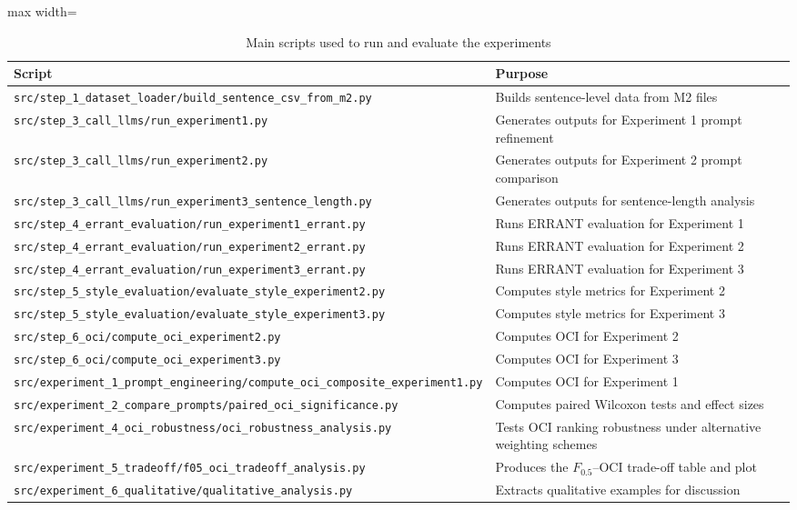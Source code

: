 \begin{table}[htbp]
    \centering
    \caption{Main scripts used to run and evaluate the experiments}
    \label{tab:appendix_scripts}
    \renewcommand{\arraystretch}{1.15}
    \begin{adjustbox}{max width=\textwidth}
    \begin{tabular}{p{6cm}p{7cm}}
        \toprule
        \textbf{Script} & \textbf{Purpose} \\
        \midrule
        \texttt{src/step\_1\_dataset\_loader/build\_sentence\_csv\_from\_m2.py} & Builds sentence-level data from M2 files \\
        \texttt{src/step\_3\_call\_llms/run\_experiment1.py} & Generates outputs for Experiment 1 prompt refinement \\
        \texttt{src/step\_3\_call\_llms/run\_experiment2.py} & Generates outputs for Experiment 2 prompt comparison \\
        \texttt{src/step\_3\_call\_llms/run\_experiment3\_sentence\_length.py} & Generates outputs for sentence-length analysis \\
        \texttt{src/step\_4\_errant\_evaluation/run\_experiment1\_errant.py} & Runs ERRANT evaluation for Experiment 1 \\
        \texttt{src/step\_4\_errant\_evaluation/run\_experiment2\_errant.py} & Runs ERRANT evaluation for Experiment 2 \\
        \texttt{src/step\_4\_errant\_evaluation/run\_experiment3\_errant.py} & Runs ERRANT evaluation for Experiment 3 \\
        \texttt{src/step\_5\_style\_evaluation/evaluate\_style\_experiment2.py} & Computes style metrics for Experiment 2 \\
        \texttt{src/step\_5\_style\_evaluation/evaluate\_style\_experiment3.py} & Computes style metrics for Experiment 3 \\
        \texttt{src/step\_6\_oci/compute\_oci\_experiment2.py} & Computes OCI for Experiment 2 \\
        \texttt{src/step\_6\_oci/compute\_oci\_experiment3.py} & Computes OCI for Experiment 3 \\
        \texttt{src/experiment\_1\_prompt\_engineering/compute\_oci\_composite\_experiment1.py} & Computes OCI for Experiment 1 \\
        \texttt{src/experiment\_2\_compare\_prompts/paired\_oci\_significance.py} & Computes paired Wilcoxon tests and effect sizes \\
        \texttt{src/experiment\_4\_oci\_robustness/oci\_robustness\_analysis.py} & Tests OCI ranking robustness under alternative weighting schemes \\
        \texttt{src/experiment\_5\_tradeoff/f05\_oci\_tradeoff\_analysis.py} & Produces the $F_{0.5}$--OCI trade-off table and plot \\
        \texttt{src/experiment\_6\_qualitative/qualitative\_analysis.py} & Extracts qualitative examples for discussion \\
        \bottomrule
    \end{tabular}
    \end{adjustbox}
\end{table}


